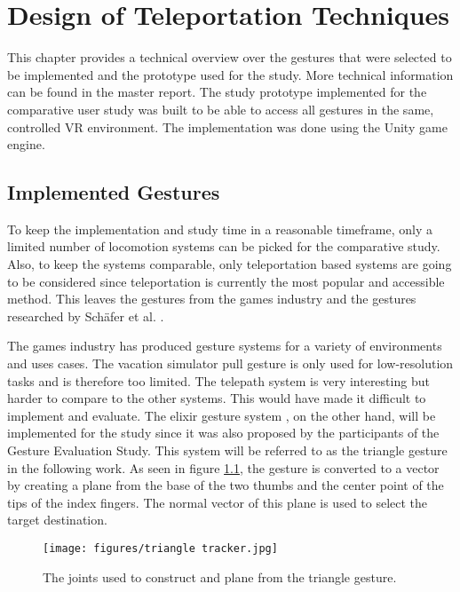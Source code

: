 \chapter{Design of Teleportation Techniques}
\label{cha:ImplementationOverview}
This chapter provides a technical overview over the gestures that were selected to be implemented and the prototype used for the study. More technical information can be found in the master report. 
The study prototype implemented for the comparative user study was built to be able to access all gestures in the same, controlled VR environment. The implementation was done using the Unity game engine. 

\section{Implemented Gestures}

To keep the implementation and study time in a reasonable timeframe, only a limited number of locomotion systems can be picked for the comparative study. Also, to keep the systems comparable, only teleportation based systems are going to be considered since teleportation is currently the most popular and accessible method. This leaves the gestures from the games industry and the gestures researched by Schäfer et al. \cite{Schafer2021}. 

The games industry has produced gesture systems for a variety of environments and uses cases. The vacation simulator pull gesture is only used for low-resolution tasks and is therefore too limited. The telepath system \cite{WaWizTelePath} is very interesting but harder to compare to the other systems. This would have made it difficult to implement and evaluate.
The elixir gesture system \cite{Magnopus}, on the other hand, will be implemented for the study since it was also proposed by the participants of the Gesture Evaluation Study. 
This system will be referred to as the triangle gesture in the following work. As seen in figure \ref{fig:triangleTracker}, the gesture is converted to a vector by creating a plane from the base of the two thumbs and the center point of the tips of the index fingers. The normal vector of this plane is used to select the target destination.

\begin{figure}[!ht]
    \centering
    \texttt{[image: figures/triangle tracker.jpg]}
    \caption{The joints used to construct and plane from the triangle gesture.}
    \label{fig:triangleTracker}
\end{figure}

